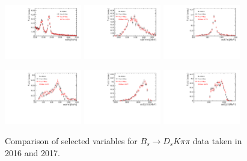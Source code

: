 \begin{figure}[h]
\centering
\includegraphics[height=!,width=0.3\textwidth]{figs/dataVsMC/year16vs17_signal/Ds2all_Bs_DTF_MM.pdf}
\includegraphics[height=!,width=0.3\textwidth]{figs/dataVsMC/year16vs17_signal/Ds2all_m_Kpipi.pdf}
\includegraphics[height=!,width=0.3\textwidth]{figs/dataVsMC/year16vs17_signal/Ds2all_m_Kpi.pdf}

\includegraphics[height=!,width=0.3\textwidth]{figs/dataVsMC/year16vs17_signal/Ds2all_m_pipi.pdf}
\includegraphics[height=!,width=0.3\textwidth]{figs/dataVsMC/year16vs17_signal/Ds2all_m_Dspipi.pdf}
\includegraphics[height=!,width=0.3\textwidth]{figs/dataVsMC/year16vs17_signal/Ds2all_m_Dspi.pdf}

\caption{Comparison of selected variables for $B_s \to D_s K \pi \pi$ data taken in 2016 and 2017.}
\label{fig:}
\end{figure}


